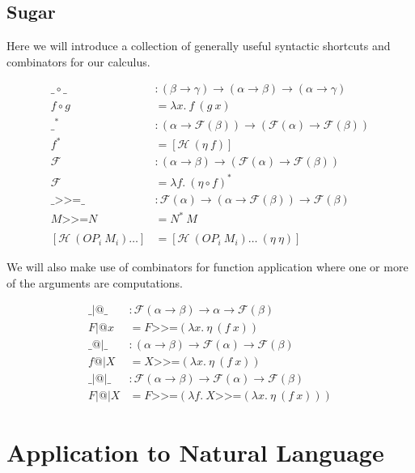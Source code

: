 \documentclass{article}
\makeatletter
\newcommand{\hsbind}{\mathbin{\texttt{>>=}}}
\newcommand{\ap}{\mathbin{|@|}}
\newcommand{\apl}{\mathbin{|@}}
\newcommand{\apr}{\mathbin{@|}}
\makeatother
\begin{document}
\subsection{Sugar}

Here we will introduce a collection of generally useful syntactic shortcuts
and combinators for our calculus.

\begin{align*}
  \_ \circ \_ &: (\beta \to \gamma) \to (\alpha \to \beta) \to (\alpha \to \gamma) \\
  f \circ g &= \lambda x.\ f\ (g\ x) \\
  \_^* &: (\alpha \to \mathcal{F}(\beta)) \to (\mathcal{F}(\alpha) \to \mathcal{F}(\beta)) \\
  f^* &= [\mathcal{H}\ (\eta\ f)] \\
  \mathcal{F} &: (\alpha \to \beta) \to (\mathcal{F}(\alpha) \to \mathcal{F}(\beta)) \\
  \mathcal{F} &= \lambda f.\ (\eta \circ f)^* \\
  \_ \hsbind \_ &: \mathcal{F}(\alpha) \to (\alpha \to \mathcal{F}(\beta)) \to \mathcal{F}(\beta) \\
  M \hsbind N &= N^*\ M \\
  \\
  [\mathcal{H}\ (OP_i\ M_i)\ldots] &= [\mathcal{H}\ (OP_i\ M_i)\ldots\ (\eta\ \eta)]
\end{align*}

We will also make use of combinators for function application where one or
more of the arguments are computations.

\begin{align*}
  \_ \apl \_ &: \mathcal{F}(\alpha \to \beta) \to \alpha \to \mathcal{F}(\beta) \\
  F \apl x &= F \hsbind (\lambda x.\ \eta\ (f\ x)) \\
  \_ \apr \_ &: (\alpha \to \beta) \to \mathcal{F}(\alpha) \to \mathcal{F}(\beta) \\
  f \apr X &= X \hsbind (\lambda x.\ \eta\ (f\ x)) \\
  \_ \ap \_ &: \mathcal{F}(\alpha \to \beta) \to \mathcal{F}(\alpha) \to \mathcal{F}(\beta) \\
  F \ap X &= F \hsbind (\lambda f.\ X \hsbind (\lambda x.\ \eta\ (f\ x)))
\end{align*}


\section{Application to Natural Language}
\end{document}

